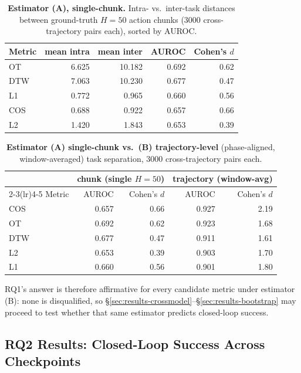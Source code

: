 \documentclass[english,12pt,a4paper,pdftex,elec,utf8]{aaltothesis}
\begin{document}
\begin{table}[H]
\centering
\caption{\textbf{Estimator (A), single-chunk.} Intra- vs.\ inter-task distances between ground-truth $H{=}50$ action chunks ($3000$ cross-trajectory pairs each), sorted by AUROC.}
\label{tab:taskdisc-chunk}
\begin{tabular}{lrrrr}
\toprule
Metric & mean intra & mean inter & AUROC & Cohen's $d$ \\
\midrule
OT  & 6.625 & 10.182 & 0.692 & 0.62 \\
DTW & 7.063 & 10.230 & 0.677 & 0.47 \\
L1  & 0.772 & 0.965  & 0.660 & 0.56 \\
COS & 0.688 & 0.922  & 0.657 & 0.66 \\
L2  & 1.420 & 1.843  & 0.653 & 0.39 \\
\bottomrule
\end{tabular}
\end{table}

\begin{table}[H]
\centering
\caption{\textbf{Estimator (A) single-chunk vs.\ (B) trajectory-level} (phase-aligned, window-averaged) task separation, $3000$ cross-trajectory pairs each. }
\label{tab:taskdisc-traj}
\begin{tabular}{lrrrr}
\toprule
 & \multicolumn{2}{c}{chunk (single $H{=}50$)} & \multicolumn{2}{c}{trajectory (window-avg)} \\
\cmidrule(lr){2-3}\cmidrule(lr){4-5}
Metric & AUROC & Cohen's $d$ & AUROC & Cohen's $d$ \\
\midrule
COS & 0.657 & 0.66 & 0.927 & 2.19 \\
OT  & 0.692 & 0.62 & 0.923 & 1.68 \\
DTW & 0.677 & 0.47 & 0.911 & 1.61 \\
L2  & 0.653 & 0.39 & 0.903 & 1.70 \\
L1  & 0.660 & 0.56 & 0.901 & 1.80 \\
\bottomrule

\end{tabular}
\end{table}

RQ1's answer is therefore affirmative for every candidate metric under estimator (B): none is disqualified, so \S\ref{sec:results-crossmodel}--\S\ref{sec:results-bootstrap} may proceed to test whether that same estimator predicts closed-loop success.

\subsection{RQ2 Results: Closed-Loop Success Across Checkpoints}
\label{sec:results-runs}
\end{document}
